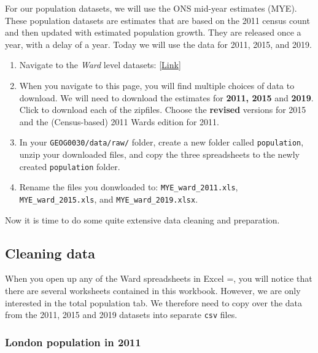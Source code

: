 \documentclass[
]{book}
\providecommand{\tightlist}{%
  \setlength{\itemsep}{0pt}\setlength{\parskip}{0pt}}
\begin{document}
For our population datasets, we will use the ONS mid-year estimates (MYE). These population datasets are estimates that are based on the 2011 census count and then updated with estimated population growth. They are released once a year, with a delay of a year. Today we will use the data for 2011, 2015, and 2019.

\begin{enumerate}
\def\labelenumi{\arabic{enumi}.}
\tightlist
\item
  Navigate to the \emph{Ward} level datasets: \href{https://www.ons.gov.uk/peoplepopulationandcommunity/populationandmigration/populationestimates/datasets/wardlevelmidyearpopulationestimatesexperimental}{{[}Link{]}}
\item
  When you navigate to this page, you will find multiple choices of data to download. We will need to download the estimates for \textbf{2011, 2015} and \textbf{2019}. Click to download each of the zipfiles. Choose the \textbf{revised} versions for 2015 and the (Census-based) 2011 Wards edition for 2011.
\item
  In your \texttt{GEOG0030/data/raw/} folder, create a new folder called \texttt{population}, unzip your downloaded files, and copy the three spreadsheets to the newly created \texttt{population} folder.
\item
  Rename the files you donwloaded to: \texttt{MYE\_ward\_2011.xls}, \texttt{MYE\_ward\_2015.xls}, and \texttt{MYE\_ward\_2019.xlsx}.
\end{enumerate}

Now it is time to do some quite extensive data cleaning and preparation.

\hypertarget{w02-cleaning}{%
\subsection{Cleaning data}\label{w02-cleaning}}

When you open up any of the Ward spreadsheets in Excel =, you will notice that there are several worksheets contained in this workbook. However, we are only interested in the total population tab. We therefore need to copy over the data from the 2011, 2015 and 2019 datasets into separate \texttt{csv} files.

\hypertarget{london-population-in-2011}{%
\subsubsection{London population in 2011}\label{london-population-in-2011}}
\end{document}
